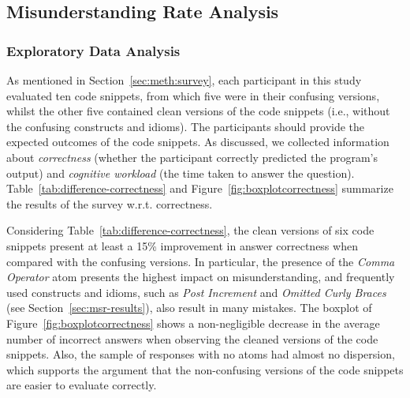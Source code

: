   


\subsection{Misunderstanding Rate Analysis}

\subsubsection*{Exploratory Data Analysis}

As mentioned in Section~\ref{sec:meth:survey}, each participant in this study evaluated ten
code snippets, from which five were in their confusing versions, whilst the other five contained clean versions of the code snippets (i.e., without the confusing constructs and idioms). The participants should provide the expected outcomes of the code snippets. As discussed, we collected information about \emph{correctness} (whether the participant correctly predicted the program's output) and \emph{cognitive workload} (the time taken to answer the question). 
Table~\ref{tab:difference-correctness} and Figure~\ref{fig:boxplotcorrectness} summarize the results of the survey w.r.t. correctness.

Considering Table~\ref{tab:difference-correctness}, the clean versions of six code snippets present at least a 15\% improvement in answer correctness when compared with the confusing versions. In particular, the presence of the \emph{Comma Operator} atom presents the highest impact on misunderstanding, and frequently used constructs and idioms, such as \emph{Post Increment} and \emph{Omitted Curly Braces} (see Section~\ref{sec:msr-results}), also result in many mistakes.%
The boxplot of Figure~\ref{fig:boxplotcorrectness} shows a non-negligible decrease in the average number of incorrect answers when observing the cleaned versions of the code snippets. Also, the sample of responses with no atoms had almost no dispersion, which supports the
argument that the non-confusing versions of the code snippets are easier to evaluate correctly. 


